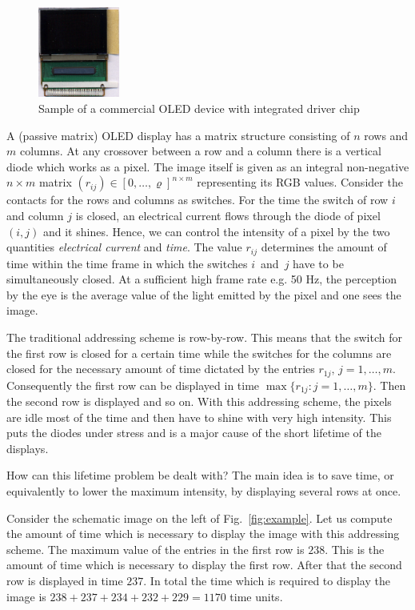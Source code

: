 \begin{figure}[ht]
  \centering \includegraphics[height=3cm]{figures/displayandchip.eps}
 \caption{Sample of a commercial OLED device with integrated driver chip}
 \label{fig:displayandchip}
\end{figure}



A (passive matrix) OLED display has a matrix structure consisting of $n$ rows
and $m$ columns.  At any crossover between a row and a column there is
a vertical diode which works as a pixel. 
The image itself is given as an integral non-negative $n \times m$ matrix
$(r_{ij}) \in [0,\ldots,\varrho]^{n \times m}$ representing its RGB values.
Consider the contacts for the rows and columns as switches.  For the
time the switch of row $i$ and column $j$ is closed, an electrical
current flows through the diode of pixel $(i,j)$ and it shines. Hence,
we can control the intensity of a pixel by the two quantities
\emph{electrical current} and \emph{time}. 
The value $r_{ij}$ determines the amount of time within the time frame
in which the switches $i$~and~$j$ have to be simultaneously closed.
At a sufficient high frame rate e.g. 50 Hz, the perception by the eye
is the average value of the light emitted by the pixel and one sees the image.

The traditional addressing scheme is row-by-row. This means that the
switch for the first row is closed for a certain time while the
switches for the columns are closed for the necessary amount of time
dictated by the entries $r_{1j},\, j=1,\ldots,m$. Consequently the first
row can be displayed in time $\max \{ r_{1j}: j = 1, \ldots, m \}$.
Then the second row is displayed and so on. With this addressing
scheme, the pixels are idle most of the time and then have to shine
with very high intensity. This puts the diodes under stress and is a
major cause of the short lifetime of the displays. 


How can this lifetime problem be dealt with? The main idea is to save
time, or equivalently to lower the maximum intensity, by displaying
several rows at once. 

Consider the schematic image on the left of Fig.~\ref{fig:example}.
Let us compute the amount of time which is
necessary to display the image with this addressing scheme.  The
maximum value of the entries in the first row is $238$. This is the
amount of time which is necessary to display the first row. After that
the second row is displayed in time $237$. In total the time which is
required to display the image is $238+237+234+232+229=1170$ time
units.

